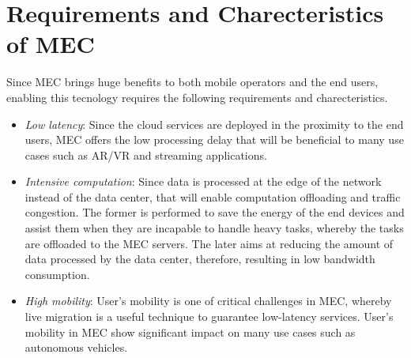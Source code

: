 \section{Requirements and Charecteristics of MEC}  \label{requirements}

Since MEC brings huge benefits to both mobile operators and the end users, enabling this tecnology requires the following requirements and charecteristics.

\begin{itemize}

\item \textit{\textit{Low latency}}: Since the cloud services are deployed in the proximity to the end users, MEC offers the low processing delay that will be beneficial to many use cases such as AR/VR and streaming applications.

\item \textit{\textit{Intensive computation}}: Since data is processed at the edge of the network instead of the data center, that will enable computation offloading and traffic congestion. The former is performed to save the energy of the end devices and assist them when they are incapable to handle heavy tasks, whereby the tasks are offloaded to the MEC servers. The later aims at reducing the amount of data processed by the data center, therefore, resulting in low bandwidth consumption.

\item \textit{\textit{High mobility}}: User's mobility is one of critical challenges in MEC, whereby live migration is a useful technique to guarantee low-latency services. User's mobility in MEC show significant impact on many use cases such as autonomous vehicles.

\end{itemize}
